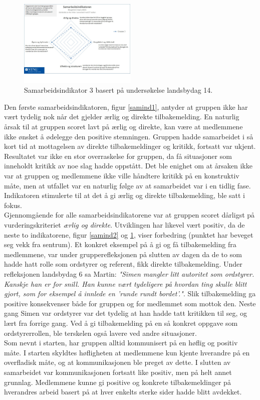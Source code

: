 \begin{figure}[h!]
  \centering
    \includegraphics[width=0.5\textwidth]{Bilder/samarbeidsindikator_3.jpg}
    \caption{Samarbeidsindikator 3 basert på undersøkelse landsbydag 14.}
    \label{samind3}
\end{figure}

Den første samarbeidsindikatoren, figur \ref{samind1}, antyder at gruppen ikke har vært tydelig nok når det gjelder ærlig og direkte tilbakemelding.
En naturlig årsak til at gruppen scoret lavt på ærlig og direkte, kan være at medlemmene ikke ønsket å ødelegge den positive stemningen.
Gruppen hadde samarbeidet i så kort tid at mottagelsen av direkte tilbakemeldinger og kritikk, fortsatt var ukjent.
Resultatet var ikke en stor overraskelse for gruppen, da få situasjoner som inneholdt kritikk av noe slag hadde oppstått.
Det ble enighet om at årsaken ikke var at gruppen og medlemmene ikke ville håndtere kritikk på en konstruktiv måte, men at utfallet var en naturlig følge av at samarbeidet var i en tidlig fase.
Indikatoren stimulerte til at det å gi ærlig og direkte tilbakemelding, ble satt i fokus. \\

Gjennomgående for alle samarbeidsindikatorene var at gruppen scoret dårligst på vurderingskriteriet \textit{ærlig og direkte}. 
Utviklingen har likevel vært positiv, da de neste to indikatorene, figur \ref{samind2} og \ref{samind3}, viser forbedring (punktet har beveget seg vekk fra sentrum). 
Et konkret eksempel på å gi og få tilbakemelding fra medlemmene, var under grupperefleksjonen på slutten av dagen da de to som hadde hatt rolle som ordstyrer og referent, fikk direkte tilbakemelding.
Under refleksjonen landsbydag 6 sa Martin: \textit{"Simen mangler litt autoritet som ordstyrer. Kanskje han er for snill. Han kunne vært tydeligere på hvordan ting skulle blitt gjort, som for eksempel å innlede en 'runde rundt bordet'."}.
Slik tilbakemelding ga positive konsekvenser både for gruppen og for medlemmet som mottok den.
Neste gang Simen var ordstyrer var det tydelig at han hadde tatt kritikken til seg, og lært fra forrige gang.
Ved å gi tilbakemelding på en så konkret oppgave som ordstyrerrollen, ble terskelen også lavere ved andre situasjoner. \\

Som nevnt i starten, har gruppen alltid kommunisert på en høflig og positiv måte.
I starten skyldtes høfligheten at medlemmene kun kjente hverandre på en overfladisk måte, og at kommunikasjonen ble preget av dette.
I slutten av samarbeidet var kommunikasjonen fortsatt like positiv, men på helt annet grunnlag.
Medlemmene kunne gi positive og konkrete tilbakemeldinger på hverandres arbeid basert på at hver enkelts sterke sider hadde blitt avdekket.